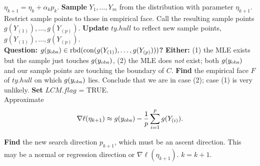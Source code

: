 {\begin{algorithmic}[1]
\State $\eta_{k+1} = \eta_k + \alpha_k p_k$.
\State \textbf{Sample} $Y_1, \ldots, Y_m$ from the distribution with parameter $\eta_{k+1}$.
	\State Restrict sample points to those in empirical face.
\EndIf
\State Call the resulting sample points $g(Y_{(1)}), \ldots, g(Y_{(p)})$.
\State \textbf{Update} $ty.hull$ to reflect new sample points, $g(Y_{(1)}), \ldots, g(Y_{(p)})$.\\
\State \textbf{Question: $g(y_{\text{obs}}) \in \operatorname{rbd}( \operatorname{con}(g(Y_{(1)}), \ldots, g(Y_{(p)}) ))$? }
{} %
	\State \textbf{Either:}
	\State (1) the MLE exists but the sample just touches $g(y_{\text{obs}})$, 
	\State (2) the MLE does \emph{not} exist; both $g(y_{\text{obs}})$ and our sample points  
	\State are touching the boundary of $C$.
	\State \textbf{Find} the empirical face $F$ of $ty.hull$ on which $g(y_{\text{obs}})$ lies.
		\State Conclude that we are in case (2); case (1) is very unlikely.
		\State \textbf{Set} $LCM.flag$ = TRUE.
	\EndIf
\EndIf\\
	\State Approximate
	\begin{align} \label{E:nabla ell approx LCM}
	\nabla \ell( \eta_{k+1}) \approx g(y_{\text{obs}}) - \frac{1}{p}\sum_{i=1}^p g(Y_{(i)}).
	\end{align}


\State \textbf{Find} the new search direction $p_{k+1}$, which must be an ascent 
direction.
\State This may be a normal or regression direction or $\nabla \ell( \eta_{k+1})$.
\State $k = k + 1$.
\EndWhile
\end{algorithmic}
}


